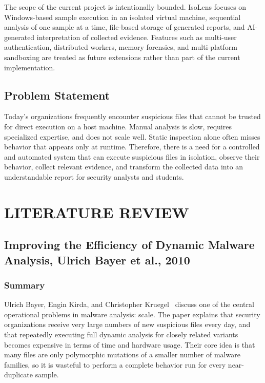 \documentclass[a4paper,12pt,oneside]{report}
\begin{document}
\par

\par

The scope of the current project is intentionally bounded. IsoLens focuses on Windows-based sample execution in an isolated virtual machine, sequential analysis of one sample at a time, file-based storage of generated reports, and AI-generated interpretation of collected evidence. Features such as multi-user authentication, distributed workers, memory forensics, and multi-platform sandboxing are treated as future extensions rather than part of the current implementation.

\section{Problem Statement}
Today's organizations frequently encounter suspicious files that cannot be trusted for direct execution on a host machine. Manual analysis is slow, requires specialized expertise, and does not scale well. Static inspection alone often misses behavior that appears only at runtime. Therefore, there is a need for a controlled and automated system that can execute suspicious files in isolation, observe their behavior, collect relevant evidence, and transform the collected data into an understandable report for security analysts and students.

\chapter{LITERATURE REVIEW}
\section{Improving the Efficiency of Dynamic Malware Analysis, Ulrich Bayer et al., 2010}

\subsection{Summary}
Ulrich Bayer, Engin Kirda, and Christopher Kruegel~\cite{bayer2010} discuss one of the central operational problems in malware analysis: scale. The paper explains that security organizations receive very large numbers of new suspicious files every day, and that repeatedly executing full dynamic analysis for closely related variants becomes expensive in terms of time and hardware usage. Their core idea is that many files are only polymorphic mutations of a smaller number of malware families, so it is wasteful to perform a complete behavior run for every near-duplicate sample.
\end{document}
